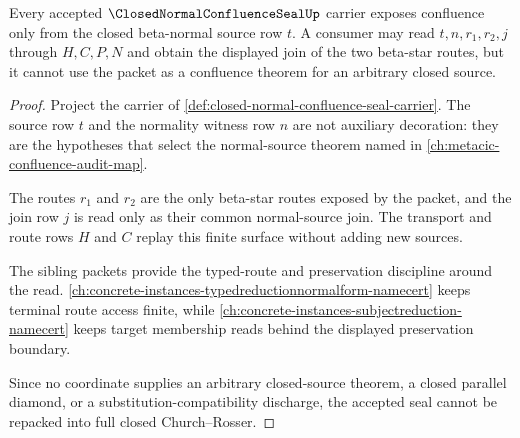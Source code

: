 \begin{theorem}
\label{thm:closed-normal-confluence-seal-normal-source}
Every accepted $\ClosedNormalConfluenceSealUp$ carrier exposes confluence only
from the closed beta-normal source row $t$. A consumer may read $t,n,r_1,r_2,j$
through $H,C,P,N$ and obtain the displayed join of the two beta-star routes,
but it cannot use the packet as a confluence theorem for an arbitrary closed
source.
\end{theorem}
\begin{proof}
Project the carrier of
\autoref{def:closed-normal-confluence-seal-carrier}. The source row $t$ and the
normality witness row $n$ are not auxiliary decoration: they are the hypotheses
that select the normal-source theorem named in
\autoref{ch:metacic-confluence-audit-map}.

The routes $r_1$ and $r_2$ are the only beta-star routes exposed by the packet,
and the join row $j$ is read only as their common normal-source join. The
transport and route rows $H$ and $C$ replay this finite surface without adding
new sources.

The sibling packets provide the typed-route and preservation discipline around
the read. \autoref{ch:concrete-instances-typedreductionnormalform-namecert}
keeps terminal route access finite, while
\autoref{ch:concrete-instances-subjectreduction-namecert} keeps target
membership reads behind the displayed preservation boundary.

Since no coordinate supplies an arbitrary closed-source theorem, a closed
parallel diamond, or a substitution-compatibility discharge, the accepted seal
cannot be repacked into full closed Church--Rosser.
\end{proof}

